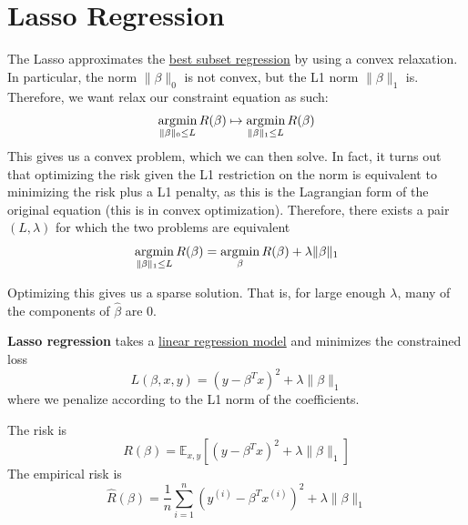 \section{Lasso Regression} 

  The Lasso approximates the \hyperref[def:best-subset-regression]{best subset regression} by using a convex relaxation. In particular, the norm $\|\beta\|_0$ is not convex, but the L1 norm $\|\beta\|_1$ is. Therefore, we want relax our constraint equation as such: 
  \begin{equation}
    \operatorname*{\arg\!\min}_{\|\beta\|_0 \leq L} R(\beta) \mapsto \operatorname*{\arg\!\min}_{\|\beta\|_1 \leq L} R(\beta)
  \end{equation}
  This gives us a convex problem, which we can then solve. In fact, it turns out that optimizing the risk given the L1 restriction on the norm is equivalent to minimizing the risk plus a L1 penalty, as this is the Lagrangian form of the original equation (this is in convex optimization). Therefore, there exists a pair $(L, \lambda)$ for which the two problems are equivalent 
  \begin{equation}
    \operatorname*{\arg\!\min}_{\|\beta\|_1 \leq L} R(\beta) = \operatorname*{\arg\!\min}_{\beta} R(\beta) + \lambda \|\beta\|_1
  \end{equation}

  Optimizing this gives us a sparse solution. That is, for large enough $\lambda$, many of the components of $\hat{\beta}$ are $0$. 

  \begin{definition}
    \label{def:lasso-regression}
    \textbf{Lasso regression} takes a \hyperref[def:linear-regression-model]{linear regression model} and minimizes the constrained loss 
    \begin{equation}
      L(\beta, x, y) = (y - \beta^T x)^2 + \lambda \|\beta\|_1
    \end{equation}
    where we penalize according to the L1 norm of the coefficients. 
  \end{definition}

  \begin{theorem}[Risk]
    \label{thm:risk-3}
    The risk is 
    \begin{equation}
      R (\beta) = \mathbb{E}_{x, y} \left[ (y - \beta^T x)^2 + \lambda \|\beta\|_1 \right]
    \end{equation}
    The empirical risk is 
    \begin{equation}
      \hat{R} (\beta) = \frac{1}{n} \sum_{i=1}^n (y^{(i)} - \beta^T x^{(i)})^2 + \lambda \|\beta\|_1
    \end{equation}
  \end{theorem}

